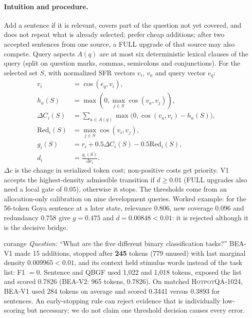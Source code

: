 \documentclass[10pt,twocolumn,letterpaper]{article}
\newcommand{\qbgf}{\textsc{QBGF}\xspace}
\newcommand{\vone}{\textsc{BEA-V1}\xspace}
\newcommand{\vtwo}{\textsc{BEA-V2}\xspace}
\newcommand{\hotpot}{\textsc{HotpotQA}\xspace}
\newcommand{\qasper}{\textsc{QASPER}\xspace}
\begin{document}
\paragraph{Intuition and procedure.} Add a sentence if it is relevant, covers part of the question not yet covered, and does not repeat what is already selected; prefer cheap additions; after two accepted sentences from one source, a FULL upgrade of that source may also compete. Query aspects $A(q)$ are at most six deterministic lexical clauses of the query (split on question marks, commas, semicolons and conjunctions). For the selected set $S$, with normalized SFR vectors $v_i$, $v_a$ and query vector $e_q$:
\begin{align}
r_i&=\cos(e_q,v_i),\nonumber\\
h_a(S)&=\max\!\left(0,\max_{j\in S}\cos(v_a,v_j)\right),\nonumber\\
\Delta C_i(S)&=\sum_{a\in A(q)}\max\bigl(0,\cos(v_a,v_i)-h_a(S)\bigr),\nonumber\\
\mathrm{Red}_i(S)&=\max_{j\in S}\cos(v_i,v_j),\nonumber\\
g_i(S)&=r_i+0.5\Delta C_i(S)-0.5\mathrm{Red}_i(S),\nonumber\\
d_i&=\frac{g_i(S)}{\Delta c_i}.\label{eq:v1}
\end{align}
$\Delta c$ is the change in serialized token cost; non-positive costs get priority. V1 accepts the highest-density admissible transition if $d\ge0.01$ (FULL upgrades also need a local gate of $0.05$), otherwise it stops. The thresholds come from an allocation-only calibration on nine development queries. Worked example: for the 56-token Goya sentence at a later state, relevance $0.806$, new coverage $0.096$ and redundancy $0.758$ give $g=0.475$ and $d=0.00848<0.01$: it is rejected although it is the decisive bridge.

\begin{case}[title={Context starvation (\qasper, $B{=}1024$)}]{corange}
\emph{Question:} ``What are the five different binary classification tasks?'' \vone made 15 additions, stopped after \textbf{245} tokens (779 unused) with last marginal density $0.009965<0.01$, and its context held stimulus words instead of the task list: F1 $=0$. Sentence and \qbgf used 1,022 and 1,018 tokens, exposed the list and scored 0.7826 (\vtwo: 965 tokens, 0.7826). On matched \hotpot-1024, \vone used 284 tokens on average and scored 0.3441 versus 0.3893 for sentences. An early-stopping rule can reject evidence that is individually low-scoring but necessary; we do not claim one threshold decision causes every error.
\end{case}
\end{document}
